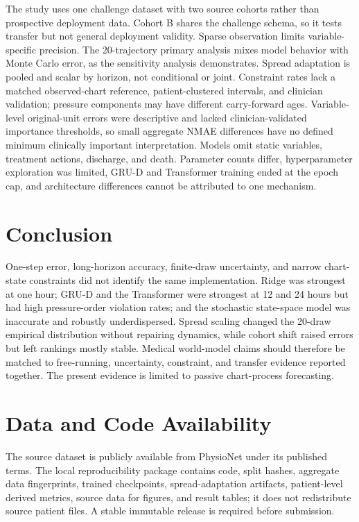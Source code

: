 \documentclass[conference]{IEEEtran}
\begin{document}
The study uses one challenge dataset with two source cohorts rather than
prospective deployment data. Cohort B shares the challenge schema, so it tests
transfer but not general deployment validity. Sparse observation limits
variable-specific precision. The 20-trajectory primary analysis mixes model
behavior with Monte Carlo error, as the sensitivity analysis demonstrates.
Spread adaptation is pooled and scalar by horizon, not conditional or joint.
Constraint rates lack a matched observed-chart reference, patient-clustered
intervals, and clinician validation; pressure components may have different
carry-forward ages. Variable-level original-unit errors were descriptive and
lacked clinician-validated importance thresholds, so small aggregate NMAE
differences have no defined minimum clinically important interpretation.
Models omit static variables, treatment actions,
discharge, and death. Parameter counts differ, hyperparameter exploration was
limited, GRU-D and Transformer training ended at the epoch cap, and
architecture differences cannot be attributed to one mechanism.

\section{Conclusion}\label{conclusion}

One-step error, long-horizon accuracy, finite-draw uncertainty, and narrow
chart-state constraints did not identify the same implementation. Ridge was
strongest at one hour; GRU-D and the Transformer were strongest at 12 and 24
hours but had high pressure-order violation rates; and the stochastic
state-space model was inaccurate and robustly underdispersed. Spread scaling
changed the 20-draw empirical distribution without repairing dynamics, while
cohort shift raised errors but left rankings mostly stable. Medical
world-model claims should therefore be matched to free-running, uncertainty,
constraint, and transfer evidence reported together. The present evidence is
limited to passive chart-process forecasting.

\section{Data and Code Availability}\label{data-and-code-availability}

The source dataset is publicly available from PhysioNet under its published
terms. The local reproducibility package contains code, split hashes,
aggregate data fingerprints, trained checkpoints, spread-adaptation artifacts,
patient-level derived metrics, source data for figures, and result tables; it
does not redistribute source patient files. A stable immutable release is
required before submission.
\end{document}
